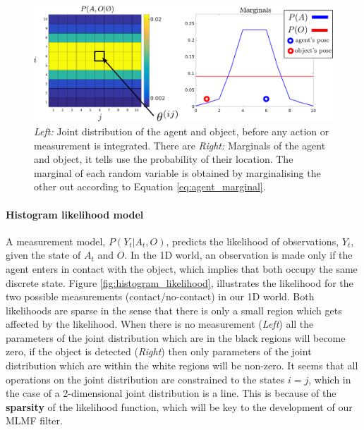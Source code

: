 \begin{figure}
 \centering
 \includegraphics[width=\textwidth]{./ch5-MLMF/Figures/explenation/hist_SLAM.pdf}
 \caption{\textit{Left:} Joint distribution of the agent and object, before any action or measurement is integrated. There are 
 \textit{Right:} Marginals of the agent and object, it tells use the probability of their location. The marginal of each 
 random variable is obtained by marginalising the other out according to Equation \ref{eq:agent_marginal}. }
 \label{fig:histogram_joint}
\end{figure}




\paragraph{Histogram likelihood model}

A measurement model, $P(Y_t|A_t,O)$, predicts the likelihood of observations, $Y_t$, given the state of $A_t$ and $O$. 
In the 1D world, an observation is made only if the agent enters in contact with the object, which implies that both
occupy the same discrete state. Figure \ref{fig:histogram_likelihood}, illustrates the likelihood for the two possible 
measurements (contact/no-contact) in our 1D world. Both likelihoods are sparse in the sense that there is only a small 
region which gets affected by the likelihood. When there is no measurement (\textit{Left}) all the parameters of the 
joint distribution which are in the black regions will become zero, if the object is detected (\textit{Right}) then 
only parameters of the joint distribution which are within the white regions will be non-zero. It seems that all 
operations on the joint distribution are constrained to the states $i = j$, which in the case of a 2-dimensional joint 
distribution is a line. This is because of the \textbf{sparsity} of the likelihood function, which will be key to 
the development of our MLMF filter.

